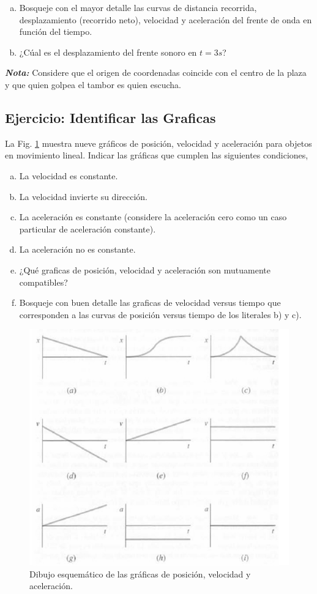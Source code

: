 \documentclass{replab}
\begin{document}
	\begin{enumerate}[a)]
		\item Bosqueje con el mayor detalle las curvas de distancia recorrida, desplazamiento (recorrido neto), velocidad y aceleración del frente de onda en función del tiempo.
		\item ¿Cúal es el desplazamiento del frente sonoro en $t=3s$?
	\end{enumerate}

	\textit{\textbf{Nota:}} Considere que el origen de coordenadas coincide con el centro de la plaza y que quien golpea el tambor es quien escucha.

	\subsection{Ejercicio: Identificar las Graficas}
	La Fig. \ref{fig:graficas} muestra nueve gráficos de posición, velocidad y aceleración para objetos en movimiento lineal. Indicar las gráficas que cumplen las siguientes condiciones,

	\begin{enumerate}[a)]
		\item La velocidad es constante.
		\item La velocidad invierte su dirección.
		\item La aceleración es constante (considere la aceleración cero como un caso particular de aceleración constante).
		\item La aceleración no es constante.
		\item ¿Qué graficas de posición, velocidad y aceleración son mutuamente compatibles?
		\item Bosqueje con buen detalle las graficas de velocidad versus tiempo que corresponden a las curvas de posición versus tiempo de los literales b) y c).
	\end{enumerate}


	\begin{figure}
		\centering
		\includegraphics[width=.8\columnwidth]{imagenes/graficas.jpeg}
		\caption{Dibujo esquemático de las gráficas de posición, velocidad y aceleración.}
		\label{fig:graficas}
	\end{figure}
\end{document}
